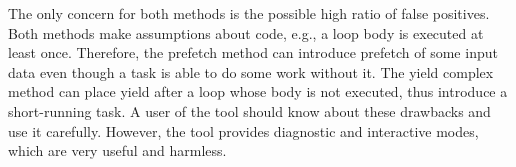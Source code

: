 The only concern for both methods is the possible high ratio of false positives. Both methods make assumptions about code, e.g., a loop body is executed at least once. Therefore, the prefetch method can introduce prefetch of some input data even though a task is able to do some work without it. The yield complex method can place yield after a loop whose body is not executed, thus introduce a short-running task. A user of the tool should know about these drawbacks and use it carefully. However, the tool provides diagnostic and interactive modes, which are very useful and harmless.
